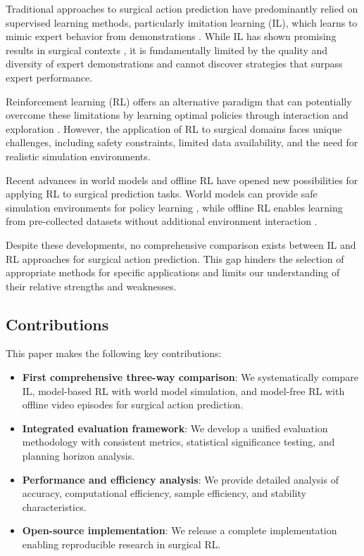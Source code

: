 \documentclass[conference]{IEEEtran}
\begin{document}
Traditional approaches to surgical action prediction have predominantly relied on supervised learning methods, particularly imitation learning (IL), which learns to mimic expert behavior from demonstrations \cite{hussein2017imitation}. While IL has shown promising results in surgical contexts \cite{gao2022trans}, it is fundamentally limited by the quality and diversity of expert demonstrations and cannot discover strategies that surpass expert performance.

Reinforcement learning (RL) offers an alternative paradigm that can potentially overcome these limitations by learning optimal policies through interaction and exploration \cite{sutton2018reinforcement}. However, the application of RL to surgical domains faces unique challenges, including safety constraints, limited data availability, and the need for realistic simulation environments.

Recent advances in world models and offline RL have opened new possibilities for applying RL to surgical prediction tasks. World models can provide safe simulation environments for policy learning \cite{ha2018world}, while offline RL enables learning from pre-collected datasets without additional environment interaction \cite{levine2020offline}.

Despite these developments, no comprehensive comparison exists between IL and RL approaches for surgical action prediction. This gap hinders the selection of appropriate methods for specific applications and limits our understanding of their relative strengths and weaknesses.

\subsection{Contributions}

This paper makes the following key contributions:

\begin{itemize}
\item \textbf{First comprehensive three-way comparison}: We systematically compare IL, model-based RL with world model simulation, and model-free RL with offline video episodes for surgical action prediction.
\item \textbf{Integrated evaluation framework}: We develop a unified evaluation methodology with consistent metrics, statistical significance testing, and planning horizon analysis.
\item \textbf{Performance and efficiency analysis}: We provide detailed analysis of accuracy, computational efficiency, sample efficiency, and stability characteristics.
\item \textbf{Open-source implementation}: We release a complete implementation enabling reproducible research in surgical RL.
\end{itemize}
\end{document}
